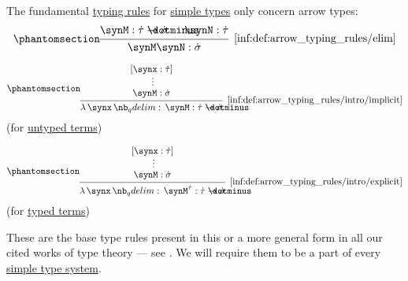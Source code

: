 \begin{definition}\label{def:arrow_typing_rules}
  The fundamental \hyperref[def:type_derivation_tree]{typing rules} for \hyperref[def:simple_type]{simple types} only concern arrow types:
  \begin{equation*}\taglabel[\ensuremath{ \rightarrow^- }]{inf:def:arrow_typing_rules/elim}
    \begin{prooftree}
      \hypo{ \synM: \syn\tau \synimplies \syn\sigma }
      \hypo{ \synN: \syn\tau }
      \infer2[\ref{inf:def:arrow_typing_rules/elim}]{ \synM \synN: \syn\sigma }
    \end{prooftree}
  \end{equation*}
  \begin{paracol}{2}
    \begin{leftcolumn}
      \centering
      \begin{equation*}\taglabel[\ensuremath{ \rightarrow^+ }]{inf:def:arrow_typing_rules/intro/implicit}
        \begin{prooftree}
          \hypo{ [\synx: \syn\tau] }
          \ellipsis {} { \synM: \syn\sigma }
          \infer1[\ref{inf:def:arrow_typing_rules/intro/implicit}]{ \qabs \synx \synM: \syn\tau \synimplies \syn\sigma }
        \end{prooftree}
      \end{equation*}
      (for \hyperref[def:lambda_term]{untyped terms})\phantom{\( \rightarrow^+ \)}
    \end{leftcolumn}

    \begin{rightcolumn}
      \centering
      \begin{equation*}\taglabel[\ensuremath{ \rightarrow_{\T{tt}}^+ }]{inf:def:arrow_typing_rules/intro/explicit}
        \begin{prooftree}
          \hypo{ [\synx: \syn\tau] }
          \ellipsis {} { \synM: \syn\sigma }
          \infer1[\ref{inf:def:arrow_typing_rules/intro/explicit}]{ \qabs \synx \synM^{\syn\tau}: \syn\tau \synimplies \syn\sigma }
        \end{prooftree}
      \end{equation*}
      (for \hyperref[def:typed_lambda_term]{typed terms})\phantom{\( \rightarrow_\tau^+ \)}
    \end{rightcolumn}
  \end{paracol}
\end{definition}
\begin{comments}
  \item These are the base type rules present in this or a more general form in all our cited works of type theory --- see . We will require them to be a part of every \hyperref[def:simple_type_system]{simple type system}.
\end{comments}

